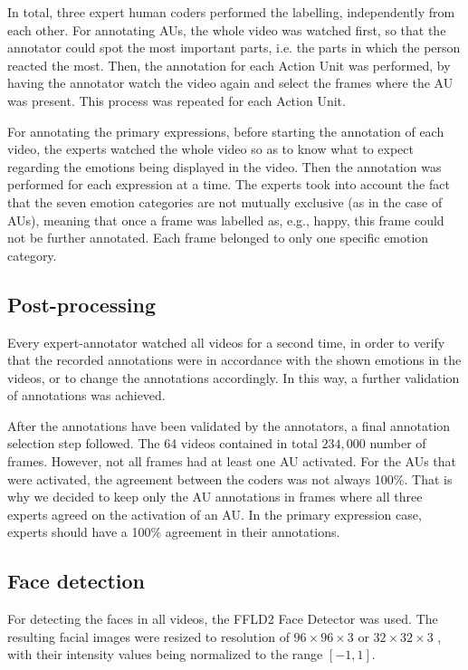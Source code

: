 \documentclass[a4paper, 10pt, conference]{ieeeconf}      %
\begin{document}
In total, three expert human coders performed the labelling, independently from each other. 
For annotating AUs, the whole video was watched first, so that the annotator could spot the most important parts, i.e. the parts in which the person reacted the most. Then, the annotation for each Action Unit was performed, by having the annotator watch the video again and select the frames where the AU was present. This process was repeated for each Action Unit.

For annotating the primary expressions, before starting the annotation of each video, the experts watched the whole video so as to know what to expect regarding the emotions being displayed in the video. Then the annotation was performed for each expression at a time. The experts took into account the fact that the seven emotion categories are not mutually exclusive (as in the case of AUs), meaning that once a frame was labelled as, e.g., happy, this frame could not be further annotated. Each frame belonged to only one specific emotion category. 


\subsection{Post-processing}

Every expert-annotator watched all videos for a second
time, in order to verify that the recorded annotations
were in accordance with the shown emotions in the videos,
or to change the annotations accordingly. In this way, a further
validation of annotations was achieved.

After the annotations have been validated by the annotators,
a final annotation selection step followed.
The 64 videos contained in total $234,000$ number of frames. However, not all frames had at least one AU activated. For the AUs that were activated, the agreement between the coders was not always 100\%. That is why we decided to keep only the AU annotations in frames where all three experts agreed on the activation of an AU. In the primary expression case, experts should have a 100\% agreement in their annotations.


\subsection{Face detection}

For detecting the faces in all videos, the FFLD2 Face Detector \cite{mathias2014face} was used.
The resulting facial images were resized to resolution of $96 \times 96 \times 3$ or $32 \times 32 \times 3$ , with their
intensity values being normalized to the range $[-1, 1]$.
\end{document}
